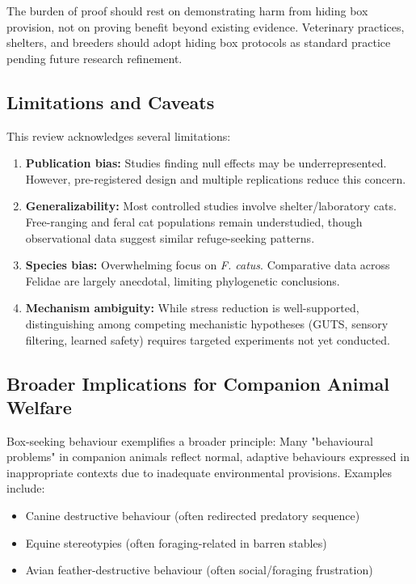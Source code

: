\documentclass[12pt,a4paper]{article}
\begin{document}
The burden of proof should rest on demonstrating harm from hiding box provision, not on proving benefit beyond existing evidence. Veterinary practices, shelters, and breeders should adopt hiding box protocols as standard practice pending future research refinement.

\subsection{Limitations and Caveats}

This review acknowledges several limitations:

\begin{enumerate}
    \item \textbf{Publication bias:} Studies finding null effects may be underrepresented. However, \citet{vinke2014} pre-registered design and multiple replications reduce this concern.
    
    \item \textbf{Generalizability:} Most controlled studies involve shelter/laboratory cats. Free-ranging and feral cat populations remain understudied, though observational data suggest similar refuge-seeking patterns.
    
    \item \textbf{Species bias:} Overwhelming focus on \textit{F. catus}. Comparative data across Felidae are largely anecdotal, limiting phylogenetic conclusions.
    
    \item \textbf{Mechanism ambiguity:} While stress reduction is well-supported, distinguishing among competing mechanistic hypotheses (GUTS, sensory filtering, learned safety) requires targeted experiments not yet conducted.
\end{enumerate}

\subsection{Broader Implications for Companion Animal Welfare}

Box-seeking behaviour exemplifies a broader principle: Many "behavioural problems" in companion animals reflect normal, adaptive behaviours expressed in inappropriate contexts due to inadequate environmental provisions. Examples include:

\begin{itemize}
    \item Canine destructive behaviour (often redirected predatory sequence)
    \item Equine stereotypies (often foraging-related in barren stables)
    \item Avian feather-destructive behaviour (often social/foraging frustration)
\end{itemize}
\end{document}

